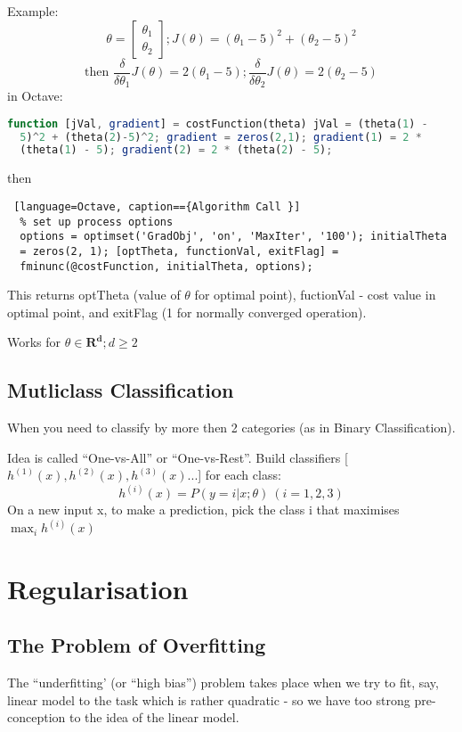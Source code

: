 \documentclass{scrartcl}
\begin{document}
Example: \[\theta = \left[ \begin{array}{c} \theta_1 \\ \theta_2
  \end{array} \right]; J(\theta) = (\theta_1 - 5)^2 + (\theta_2- 5)^2 \]
\[\textrm{then } \frac{\delta}{\delta \theta_1}J(\theta) = 2(\theta_1
-5) ;\frac{\delta}{\delta \theta_2}J(\theta) = 2(\theta_2 - 5)
\]
in Octave:
\begin{lstlisting}[language=Octave, caption=={Plugin function }]
  function [jVal, gradient] = costFunction(theta) jVal = (theta(1) -
  5)^2 + (theta(2)-5)^2; gradient = zeros(2,1); gradient(1) = 2 *
  (theta(1) - 5); gradient(2) = 2 * (theta(2) - 5);
\end{lstlisting}
then
\begin{lstlisting} [language=Octave, caption=={Algorithm Call }]
  % set up process options
  options = optimset('GradObj', 'on', 'MaxIter', '100'); initialTheta
  = zeros(2, 1); [optTheta, functionVal, exitFlag] =
  fminunc(@costFunction, initialTheta, options);
\end{lstlisting}
This returns optTheta (value of $\theta$ for optimal point),
fuctionVal - cost value in optimal point, and exitFlag (1 for normally
converged operation).

Works for $\theta \in \mathbf{R^d}; d \geq 2$

\subsection{Mutliclass Classification}
\label{sec:6-7}
When you need to classify by more then 2 categories (as in Binary
Classification).

Idea is called ``One-vs-All'' or ``One-vs-Rest''. Build classifiers
[$h^{(1)}(x), h^{(2)}(x), h^{(3)}(x)... $] for each class: \[
h^{(i)}(x) = P(y = i|x;\theta) \ (i = 1, 2, 3)
\]
On a new input x, to make a prediction, pick the class i that
maximises $\max_i h^{(i)}(x)$

\section{Regularisation}
\label{sec:7}

\subsection{The Problem of Overfitting}
\label{sec:7-1}
The ``underfitting' (or ``high bias'') problem takes place when we try
to fit, say, linear model to the task which is rather quadratic - so
we have too strong pre-conception to the idea of the linear model.
\end{document}

